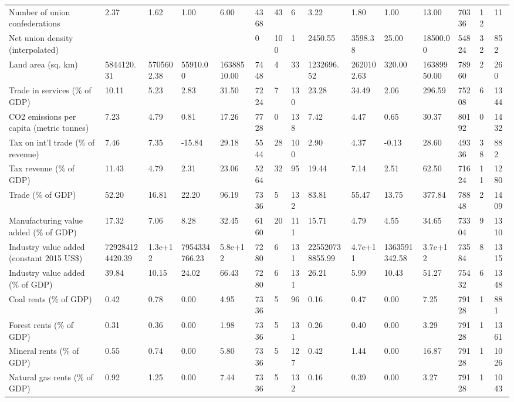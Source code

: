 \begin{longtable}{lllllllllllllll}
Number of union confederations & 2.37 & 1.62 & 1.00 & 6.00 & 4368 & 43 & 6 & 3.22 & 1.80 & 1.00 & 13.00 & 70336 & 12 & 11\\
Net union density (interpolated) &  &  &  &  & 0 & 100 & 1 & 2450.55 & 3598.38 & 25.00 & 18500.00 & 54824 & 32 & 852\\
Land area (sq. km) & 5844120.31 & 5705602.38 & 55910.00 & 16388510.00 & 7448 & 4 & 33 & 1232696.52 & 2620102.63 & 320.00 & 16389950.00 & 78960 & 2 & 260\\
\addlinespace
Trade in services (\% of GDP) & 10.11 & 5.23 & 2.83 & 31.50 & 7224 & 7 & 130 & 23.28 & 34.49 & 2.06 & 296.59 & 75208 & 6 & 1344\\
CO2 emissions per capita (metric tonnes) & 7.23 & 4.79 & 0.81 & 17.26 & 7728 & 0 & 138 & 7.42 & 4.47 & 0.65 & 30.37 & 80192 & 0 & 1432\\
Tax on int'l trade (\% of revenue) & 7.46 & 7.35 & -15.84 & 29.18 & 5544 & 28 & 100 & 2.90 & 4.37 & -0.13 & 28.60 & 49336 & 38 & 882\\
Tax revenue (\% of GDP) & 11.43 & 4.79 & 2.31 & 23.06 & 5264 & 32 & 95 & 19.44 & 7.14 & 2.51 & 62.50 & 71624 & 11 & 1280\\
Trade (\% of GDP) & 52.20 & 16.81 & 22.20 & 96.19 & 7336 & 5 & 132 & 83.81 & 55.47 & 13.75 & 377.84 & 78848 & 2 & 1409\\
\addlinespace
Manufacturing value added (\% of GDP) & 17.32 & 7.06 & 8.28 & 32.45 & 6160 & 20 & 111 & 15.71 & 4.79 & 4.55 & 34.65 & 73304 & 9 & 1310\\
Industry value added (constant 2015 US\$) & 729284124420.39 & 1.3e+12 & 7954334766.23 & 5.8e+12 & 7280 & 6 & 131 & 225520738855.99 & 4.7e+11 & 1363591342.58 & 3.7e+12 & 73584 & 8 & 1315\\
Industry value added (\% of GDP) & 39.84 & 10.15 & 24.02 & 66.43 & 7280 & 6 & 131 & 26.21 & 5.99 & 10.43 & 51.27 & 75432 & 6 & 1348\\
Coal rents (\% of GDP) & 0.42 & 0.78 & 0.00 & 4.95 & 7336 & 5 & 96 & 0.16 & 0.47 & 0.00 & 7.25 & 79128 & 1 & 881\\
Forest rents (\% of GDP) & 0.31 & 0.36 & 0.00 & 1.98 & 7336 & 5 & 131 & 0.26 & 0.40 & 0.00 & 3.29 & 79128 & 1 & 1361\\
\addlinespace
Mineral rents (\% of GDP) & 0.55 & 0.74 & 0.00 & 5.80 & 7336 & 5 & 127 & 0.42 & 1.44 & 0.00 & 16.87 & 79128 & 1 & 1026\\
Natural gas rents (\% of GDP) & 0.92 & 1.25 & 0.00 & 7.44 & 7336 & 5 & 132 & 0.16 & 0.39 & 0.00 & 3.27 & 79128 & 1 & 1043\\

\end{longtable}
